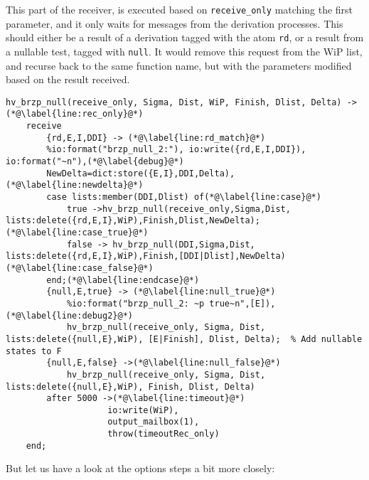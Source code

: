 This part of the receiver, is executed based on \texttt{receive\_only}
matching the first parameter, and it only waits for messages from the
derivation processes. This should either be a result of a derivation
tagged with the atom \texttt{rd}, or a result from a nullable test,
tagged with \texttt{null}. It would remove this request from the WiP
list, and recurse back to the same function name, but with the
parameters modified based on the result received.
\begin{lstlisting}[name=hvp2]
%Receive only, nothing to derive
hv_brzp_null(receive_only, Sigma, Dist, WiP, Finish, Dlist, Delta) ->(*@\label{line:rec_only}@*)
	receive
		{rd,E,I,DDI} -> (*@\label{line:rd_match}@*)
		%io:format("brzp_null_2:"), io:write({rd,E,I,DDI}), io:format("~n"),(*@\label{debug}@*)
		NewDelta=dict:store({E,I},DDI,Delta),(*@\label{line:newdelta}@*)
		case lists:member(DDI,Dlist) of(*@\label{line:case}@*)
			true ->hv_brzp_null(receive_only,Sigma,Dist, lists:delete({rd,E,I},WiP),Finish,Dlist,NewDelta);(*@\label{line:case_true}@*)
			false -> hv_brzp_null(DDI,Sigma,Dist, lists:delete({rd,E,I},WiP),Finish,[DDI|Dlist],NewDelta)(*@\label{line:case_false}@*)
		end;(*@\label{line:endcase}@*)
		{null,E,true} -> (*@\label{line:null_true}@*)
			%io:format("brzp_null_2: ~p true~n",[E]), (*@\label{line:debug2}@*)
			hv_brzp_null(receive_only, Sigma, Dist, lists:delete({null,E},WiP), [E|Finish], Dlist, Delta);	% Add nullable states to F
		{null,E,false} ->(*@\label{line:null_false}@*)
			hv_brzp_null(receive_only, Sigma, Dist, lists:delete({null,E},WiP), Finish, Dlist, Delta)
		after 5000 ->(*@\label{line:timeout}@*)
					io:write(WiP),
					output_mailbox(1),
					throw(timeoutRec_only)
	end;
\end{lstlisting}
But let us have a look at the options steps a bit more closely:
